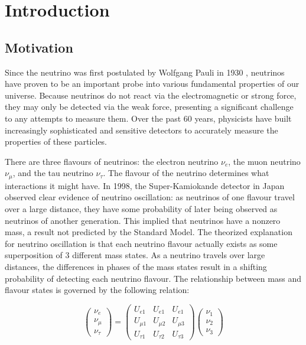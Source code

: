 
\chapter{Introduction}
\label{ch:Introduction}

\section{Motivation}

Since the neutrino was first postulated by Wolfgang Pauli in 1930 \cite{neutrinoHistory}, neutrinos have proven to be an important probe into various fundamental properties of our universe.
Because neutrinos do not react via the electromagnetic or strong force, they may only be detected via the weak force, presenting a significant challenge to any attempts to measure them.
Over the past 60 years, physicists have built increasingly sophisticated and sensitive detectors to accurately measure the properties of these particles.

There are three flavours of neutrinos: the electron neutrino $\nu_e$, the muon neutrino $\nu_\mu$, and the tau neutrino $\nu_\tau$.
The flavour of the neutrino determines what interactions it might have.
In 1998, the Super-Kamiokande detector in Japan observed clear evidence of neutrino oscillation: as neutrinos of one flavour travel over a large distance, they have some probability of later being observed as neutrinos of another generation.
This implied that neutrinos have a nonzero mass, a result not predicted by the Standard Model.
The theorized explanation for neutrino oscillation is that each neutrino flavour actually exists as some superposition of 3 different mass states. As a neutrino travels over large distances, the differences in phases of the mass states result in a shifting probability of detecting each neutrino flavour.
The relationship between mass and flavour states is governed by the following relation:

\begin{equation}
\begin{pmatrix}
\nu_e \\ \nu_\mu \\ \nu_\tau
\end{pmatrix}
=
\begin{pmatrix}
U_{e1} & U_{e1} & U_{e1} \\ 
U_{\mu 1} & U_{\mu 2} & U_{\mu 3} \\
U_{\tau 1} & U_{\tau 2} & U_{\tau 3}
\end{pmatrix}
\begin{pmatrix}
\nu_1 \\ \nu_2 \\ \nu_3
\end{pmatrix}
\end{equation}


